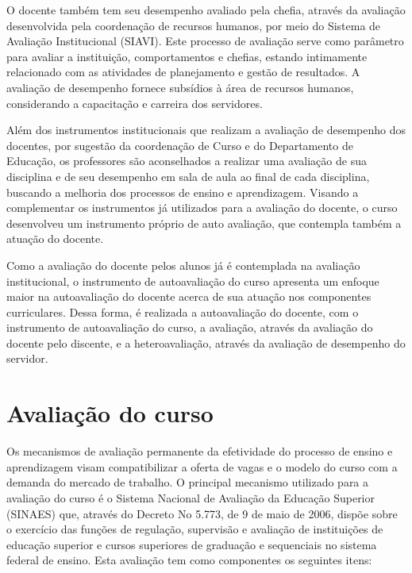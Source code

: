 O docente também tem seu desempenho avaliado pela chefia, através da avaliação desenvolvida pela coordenação de recursos humanos, por meio do Sistema de Avaliação Institucional (SIAVI). Este processo de avaliação serve como parâmetro para avaliar a instituição, comportamentos e chefias, estando intimamente relacionado com as atividades de planejamento e gestão de resultados. A avaliação de desempenho fornece subsídios à área de recursos humanos, considerando a capacitação e carreira dos servidores.


Além dos instrumentos institucionais que realizam a avaliação de desempenho dos docentes, por sugestão da coordenação de Curso e do Departamento de Educação, os professores são aconselhados a realizar uma avaliação de sua disciplina e de seu desempenho em sala de aula ao final de cada disciplina, buscando a melhoria dos processos de ensino e aprendizagem. Visando a complementar os instrumentos já utilizados para a avaliação do docente, o curso desenvolveu um instrumento próprio de auto avaliação, que contempla também a atuação do docente.

Como a avaliação do docente pelos alunos já é contemplada na avaliação institucional, o instrumento de autoavaliação do curso apresenta um enfoque maior na autoavaliação do docente acerca de sua atuação nos componentes curriculares. Dessa forma, é realizada a autoavaliação do docente, com o instrumento de autoavaliação do curso, a avaliação, através da avaliação do docente pelo discente, e a heteroavaliação, através da avaliação de desempenho do servidor.

\section{Avaliação do curso}

Os mecanismos de avaliação permanente da efetividade do processo de ensino e aprendizagem visam compatibilizar a oferta de vagas e o modelo do curso com a demanda do mercado de trabalho. O principal mecanismo utilizado para a avaliação do curso é o Sistema Nacional de Avaliação da Educação Superior (SINAES) que, através do Decreto No 5.773, de 9 de maio de 2006, dispõe sobre o exercício das funções de regulação, supervisão e avaliação de instituições de educação superior e cursos superiores de graduação e sequenciais no sistema federal de ensino. Esta avaliação tem como componentes os seguintes itens:

